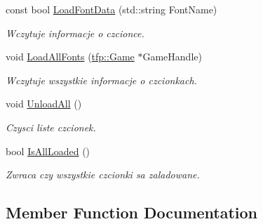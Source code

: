 \begin{DoxyCompactItemize}
\mbox{\label{classtfp_1_1_font_list_class_af2f83612a751cb6d80eebe8dbe640311}} 
const bool \mbox{\hyperlink{classtfp_1_1_font_list_class_af2f83612a751cb6d80eebe8dbe640311}{Load\+Font\+Data}} (std\+::string Font\+Name)
\begin{DoxyCompactList}\small\item\em Wczytuje informacje o czcionce. \end{DoxyCompactList}\item 
void \mbox{\hyperlink{classtfp_1_1_font_list_class_aa47acbb4435595a46d5b9c1af8904a09}{Load\+All\+Fonts}} (\mbox{\hyperlink{classtfp_1_1_game}{tfp\+::\+Game}} $\ast$Game\+Handle)
\begin{DoxyCompactList}\small\item\em Wczytuje wszystkie informacje o czcionkach. \end{DoxyCompactList}\item 
\mbox{\label{classtfp_1_1_font_list_class_a60de9c4a5e4251d987a77bf656efc9ce}} 
void \mbox{\hyperlink{classtfp_1_1_font_list_class_a60de9c4a5e4251d987a77bf656efc9ce}{Unload\+All}} ()
\begin{DoxyCompactList}\small\item\em Czysci liste czcionek. \end{DoxyCompactList}\item 
\mbox{\label{classtfp_1_1_font_list_class_a2abfed8d8bd9a1e05c76e9db2a5b3cde}} 
bool \mbox{\hyperlink{classtfp_1_1_font_list_class_a2abfed8d8bd9a1e05c76e9db2a5b3cde}{Is\+All\+Loaded}} ()
\begin{DoxyCompactList}\small\item\em Zwraca czy wszystkie czcionki sa zaladowane. \end{DoxyCompactList}\end{DoxyCompactItemize}


\subsection{Member Function Documentation}
\mbox{\label{classtfp_1_1_font_list_class_aa47acbb4435595a46d5b9c1af8904a09}} 
